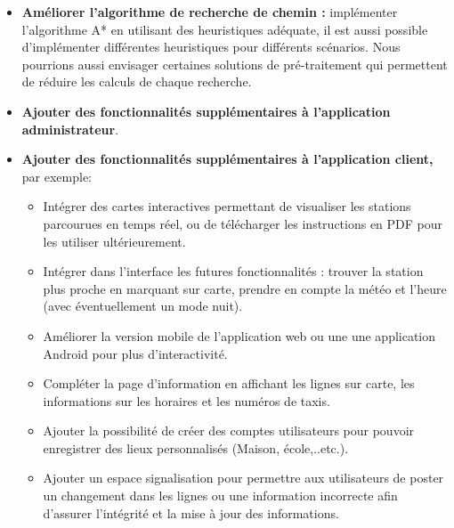 \begin{itemize}
	\item \textbf{Améliorer l'algorithme de recherche de chemin :}  implémenter l'algorithme A* en utilisant des heuristiques adéquate, il est aussi possible d'implémenter différentes heuristiques pour différents scénarios.\newline
	Nous pourrions aussi envisager certaines solutions de pré-traitement qui permettent de réduire les calculs de chaque recherche.
	\item \textbf{Ajouter des fonctionnalités supplémentaires à l'application administrateur}.
	\item \textbf{Ajouter des fonctionnalités supplémentaires à l'application client,} par exemple:
		\begin{itemize}
			\item Intégrer des cartes interactives permettant de visualiser les stations parcourues en temps réel, ou de télécharger les instructions en PDF pour les utiliser ultérieurement.
			\item Intégrer dans l'interface les futures fonctionnalités : trouver la station plus proche en marquant sur carte, prendre en compte la météo et l'heure (avec éventuellement un mode nuit).
			\item Améliorer la version mobile de l'application web ou une une application Android pour plus d'interactivité.
			\item Compléter la page d'information en affichant les lignes sur carte, les informations sur les horaires et les numéros de taxis.
			\item Ajouter la possibilité de créer des comptes utilisateurs pour pouvoir enregistrer des lieux personnalisés (Maison, école,..etc.).
			\item Ajouter un espace signalisation pour permettre aux utilisateurs de poster un changement dans les lignes ou une information incorrecte afin d'assurer l'intégrité et la mise à jour des informations.
		\end{itemize}
\end{itemize}